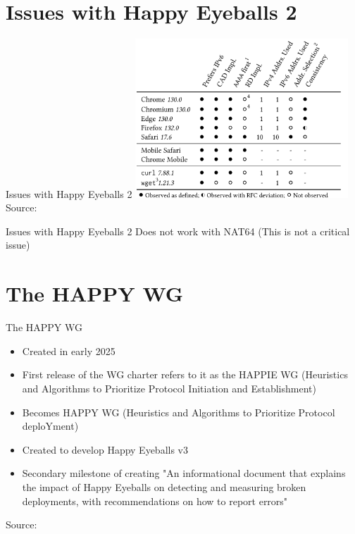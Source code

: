 \documentclass[aspectratio=169]{beamer}
\begin{document}
\section{Issues with Happy Eyeballs 2}
\begin{frame}{Issues with Happy Eyeballs 2}
  \centering
  \includegraphics[width=0.6\textwidth]{impl3.png}
  \\
  {\tiny Source: }
\end{frame}


\begin{frame}{Issues with Happy Eyeballs 2}
  \centering
  Does not work with NAT64 (This is not a critical issue) 
\end{frame}

\section{The HAPPY WG}
\begin{frame}{The HAPPY WG}
  \begin{itemize}
    \item Created in early 2025
    \item First release of the WG charter refers to it as the HAPPIE WG (Heuristics and Algorithms to Prioritize Protocol Initiation and Establishment)
    \item Becomes HAPPY WG (Heuristics and Algorithms to Prioritize Protocol deploYment)
    \item Created to develop Happy Eyeballs v3
    \item Secondary milestone of creating "An informational document that explains the impact of Happy Eyeballs on detecting and measuring broken deployments, with recommendations on how to report errors"
  \end{itemize}
  \centering
  {\tiny Source: }
\end{frame}
\end{document}
